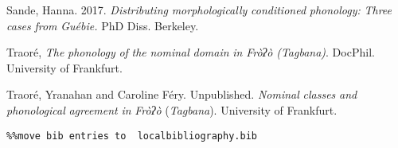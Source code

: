 Sande, Hanna. 2017. \textit{Distributing} \textit{morphologically} \textit{conditioned} \textit{phonology:} \textit{Three} \textit{cases} \textit{from} \textit{Guébie.} PhD Diss. Berkeley.

Traoré, \citet{Yranahan2018} \textit{The} \textit{phonology} \textit{of} \textit{the} \textit{nominal} \textit{domain} \textit{in} \textit{Fròʔò} \textit{(Tagbana)}. DocPhil. University of Frankfurt.

Traoré, Yranahan and Caroline Féry. Unpublished. \textit{Nominal} \textit{classes} \textit{and} \textit{phonological} \textit{agreement} \textit{in} \textit{Fròʔò} (\textit{Tagbana}). University of Frankfurt. 


\begin{verbatim}%%move bib entries to  localbibliography.bib
\end{verbatim}
